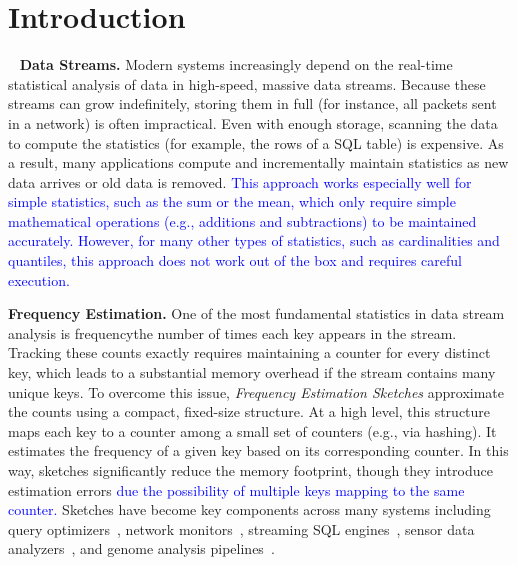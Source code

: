 \documentclass[sigconf]{acmart}
\begin{document}
\section{Introduction}~\label{sec:introduction}
\textbf{Data Streams.}
Modern systems increasingly depend on the real-time statistical analysis of
data in high-speed, massive data streams. Because these streams can grow
indefinitely, storing them in full (for instance, all packets sent in a
network) is often impractical. Even with enough storage, scanning the data to
compute the statistics (for example, the rows of a SQL table) is expensive. As
a result, many applications compute and incrementally maintain statistics as
new data arrives or old data is removed. \textcolor{blue}{This approach works
especially well for simple statistics, such as the sum or the mean, which only
require simple mathematical operations (e.g., additions and subtractions) to be
maintained accurately. However, for many other types of statistics, such as
cardinalities and quantiles, this approach does not work out of the box and
requires careful execution.}

\textbf{Frequency Estimation.}
One of the most fundamental statistics in data stream analysis is
frequency{\textemdash}the number of times each key appears in the stream.
Tracking these counts exactly requires maintaining a counter for every distinct
key, which leads to a substantial memory overhead if the stream contains many
unique keys. To overcome this issue, \emph{Frequency Estimation Sketches}
approximate the counts using a compact, fixed-size structure. At a high level,
this structure maps each key to a counter among a small set of counters (e.g.,
via hashing). It estimates the frequency of a given key based on its
corresponding counter. In this way, sketches significantly reduce the memory
footprint, though they introduce estimation errors \textcolor{blue}{due the
possibility of multiple keys mapping to the same counter.}
Sketches have become key components across many systems
including query
optimizers~\cite{Compass,QueryOptimizationSketches,ConvolutionSketch}, network
monitors~\cite{SketchBasedChangeDetection,WhatsNew,SketchingStreamsNet,TrafficManagementSurvey,RandomizedAdmissionEstimation,Blink,LOFT},
streaming SQL engines~\cite{Flink}, sensor data
analyzers~\cite{SensorDataAnalytics,RobustAggregationSensorNetworks}, and
genome analysis pipelines~\cite{CMSkmer,SetMinSketch}.
\end{document}
